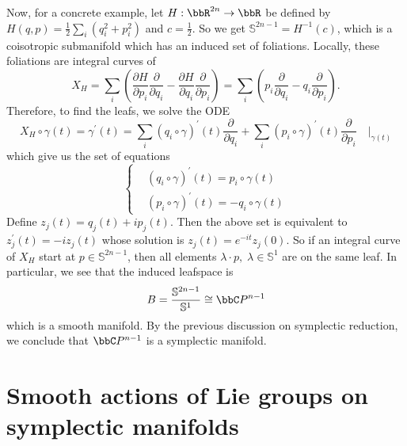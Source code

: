 \begin{example}
    Now, for a concrete example, let $H:\bbR^{2n}\to\bbR$ be defined by $H(q,p)=\frac12\sum_i(q_i^2+p_i^2)$ and $c=\frac12$. 
    So we get $\mathbb{S}^{2n-1}=H^{-1}(c)$, which is a coisotropic submanifold which has an induced set of foliations. 
    Locally, these foliations are integral curves of 
    \begin{equation}
        X_H=\sum_i(\frac{\partial H}{\partial p_i}\frac{\partial}{\partial q_i}
        -\frac{\partial H}{\partial q_i}\frac{\partial}{\partial p_i})
        =\sum_i(p_i \frac{\partial}{\partial q_i}  - q_i\frac{\partial}{\partial p_i}).
    \end{equation}
    Therefore, to find the leafs, we solve the ODE
    \begin{equation}
        X_H\circ\gamma(t)=\gamma^\prime(t)=\sum_i(q_i\circ\gamma)^\prime(t)\frac{\partial}{\partial q_i}+
        \sum_i(p_i\circ\gamma)^\prime(t)\frac{\partial}{\partial p_i} \quad \bigg|_{\gamma(t)}
    \end{equation}
    which give us the set of equations
    \begin{equation}
        \left\{\begin{aligned}
            &(q_i\circ\gamma)^\prime(t)=p_i\circ\gamma(t)\\
            &(p_i\circ \gamma)^\prime(t)=-q_i\circ\gamma(t)
        \end{aligned}\right.
    \end{equation}
    Define $z_j(t)=q_j(t)+ip_j(t)$. Then the above set is equivalent to $z_j^\prime(t)=-iz_j(t)$ whose solution is 
    $z_j(t)=e^{-it}z_j(0)$. So if an integral curve of $X_H$ start at $p\in\mathbb{S}^{2n-1}$, then all elements 
    $\lambda\cdot p,\;\lambda\in\mathbb{S}^1$ are on the same leaf. In particular, we see that the induced leafspace is 
    \begin{equation}
        B = \frac{\mathbb{S}^{2n-1}}{\mathbb{S}^1}\cong\bbC P^{n-1}
    \end{equation}
    which is a smooth manifold. By the previous discussion on symplectic reduction, we 
    conclude that $\bbC P^{n-1}$ is a symplectic manifold.
\end{example}

\section{Smooth actions of Lie groups on symplectic manifolds}
